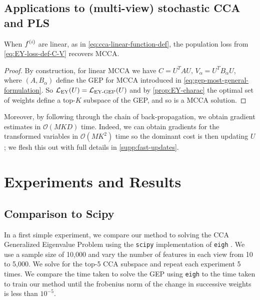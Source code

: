 \subsection{Applications to (multi-view) stochastic CCA and PLS}
\begin{lemma}
    When $f^{(i)}$ are linear, as in \ref{eq:cca-linear-function-def}, the population loss from \cref{eq:EY-loss-def-C-V} recovers MCCA.
\end{lemma}
\begin{proof}
    By construction, for linear MCCA we have $C = U^T A U,\, V_\alpha=U^T B_\alpha U$, where $(A, B_\alpha)$ define the GEP for MCCA introduced in \cref{eq:gep-most-general-formulation}.
    So $\mathcal{L}_\text{EY}(U) = \mathcal{L}_\text{EY-GEP}(U)$ and by \cref{prop:EY-charac} the optimal set of weights define a top-$K$ subspace of the GEP, and so is a MCCA solution.
\end{proof}

Moreover, by following through the chain of back-propagation, we obtain gradient estimates in $\mathcal{O}(MKD)$ time.
Indeed, we can obtain gradients for the transformed variables in $\mathcal{O}(M K^2)$ time so the dominant cost is then updating $U$; we flesh this out with full details in \cref{supp:fast-updates}.

\section{Experiments and Results}

\subsection{Comparison to Scipy}
In a first simple experiment, we compare our method to solving the CCA Generalized Eigenvalue Problem using the \texttt{scipy} implementation of \texttt{eigh} \citep{virtanen2020scipy}.
We use a sample size of 10,000 and vary the number of features in each view from 10 to 5,000.
We solve for the top-5 CCA subspace and repeat each experiment 5 times.
We compare the time taken to solve the GEP using \texttt{eigh} to the time taken to train our method until the frobenius norm of the change in successive weights is less than $10^{-5}$.

